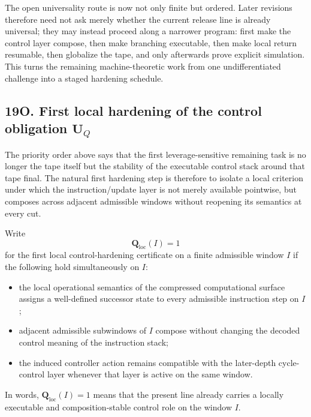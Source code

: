 \begin{corollary}
The open universality route is now not only finite but ordered. Later revisions therefore need not ask merely whether the current release line is already universal; they may instead proceed along a narrower program: first make the control layer compose, then make branching executable, then make local return resumable, then globalize the tape, and only afterwards prove explicit simulation. This turns the remaining machine-theoretic work from one undifferentiated challenge into a staged hardening schedule.
\end{corollary}



\subsection*{19O. First local hardening of the control obligation $\mathbf U_Q$}
The priority order above says that the first leverage-sensitive remaining task is no longer the tape itself but the stability of the executable control stack around that tape final. The natural first hardening step is therefore to isolate a local criterion under which the instruction/update layer is not merely available pointwise, but composes across adjacent admissible windows without reopening its semantics at every cut.

\begin{definition}
Write
\[
\mathbf Q_{\mathrm{loc}}(I)=1
\]
for the first local control-hardening certificate on a finite admissible window $I$ if the following hold simultaneously on $I$:
\begin{itemize}[leftmargin=2em]
 \item the local operational semantics of the compressed computational surface assigns a well-defined successor state to every admissible instruction step on $I$;
 \item adjacent admissible subwindows of $I$ compose without changing the decoded control meaning of the instruction stack;
 \item the induced controller action remains compatible with the later-depth cycle-control layer whenever that layer is active on the same window.
\end{itemize}
In words, $\mathbf Q_{\mathrm{loc}}(I)=1$ means that the present line already carries a locally executable and composition-stable control role on the window $I$.
\end{definition}

